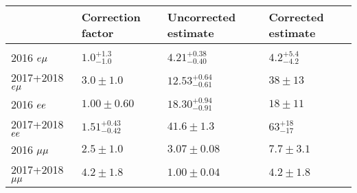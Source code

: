 \begin{table}
\renewcommand{\arraystretch}{1.2}
\noindent \centering{}
\label{100to500um_estimates}
\begin{tabular}{llll}
\hline
  & Correction factor & Uncorrected estimate & Corrected estimate\\
  \hline\\[-2.4ex]
2016 $e{\mu}$       & $1.0^{+1.3}_{-1.0}$    & $4.21^{+0.38}_{-0.40}$  & $4.2^{+5.4}_{-4.2}$\\[0.5ex]
2017+2018 $e{\mu}$  & $3.0\pm1.0$            & $12.53^{+0.64}_{-0.61}$ & $38\pm13$\\[0.5ex]
2016 $ee$        & $1.00\pm0.60$          & $18.30^{+0.94}_{-0.91}$ & $18\pm11$\\[0.5ex]
2017+2018 $ee$   & $1.51^{+0.43}_{-0.42}$ & $41.6\pm1.3$            & $63^{+18}_{-17}$\\[0.5ex]
2016 ${\mu}{\mu}$      & $2.5\pm1.0$            & $3.07\pm0.08$           & $7.7\pm3.1$\\[0.5ex]
2017+2018 ${\mu}{\mu}$ & $4.2\pm1.8$            & $1.00\pm0.04$           & $4.2\pm1.8$\\[0.5ex]
\hline
\end{tabular}
\end{table}